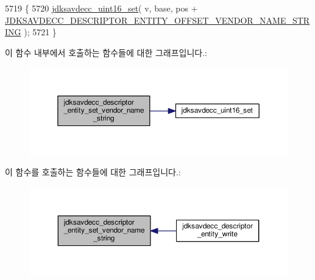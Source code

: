 \begin{DoxyCode}
5719 \{
5720     \hyperlink{group__endian_ga14b9eeadc05f94334096c127c955a60b}{jdksavdecc\_uint16\_set}( v, base, pos + 
      \hyperlink{group__descriptor__entity_ga2c69bc2c12392a988ba6ce130d778680}{JDKSAVDECC\_DESCRIPTOR\_ENTITY\_OFFSET\_VENDOR\_NAME\_STRING}
       );
5721 \}
\end{DoxyCode}


이 함수 내부에서 호출하는 함수들에 대한 그래프입니다.\+:
\nopagebreak
\begin{figure}[H]
\begin{center}
\leavevmode
\includegraphics[width=350pt]{group__descriptor__entity_ga33e995f481c1205994c92fd4d6d6f26e_cgraph}
\end{center}
\end{figure}




이 함수를 호출하는 함수들에 대한 그래프입니다.\+:
\nopagebreak
\begin{figure}[H]
\begin{center}
\leavevmode
\includegraphics[width=350pt]{group__descriptor__entity_ga33e995f481c1205994c92fd4d6d6f26e_icgraph}
\end{center}
\end{figure}


